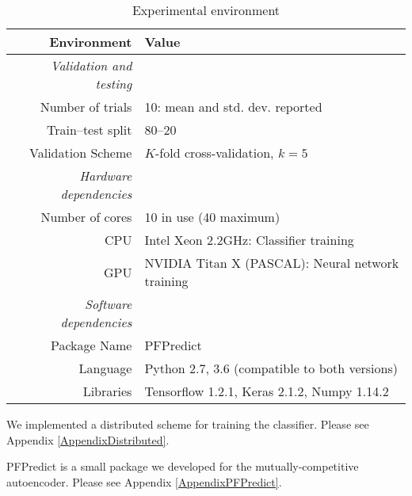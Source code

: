 \begin{table}[!h]
  \centering
  \caption{Experimental environment}
  \label{exp:implementation}
  \begin{threeparttable}
  \begin{tabular}{@{}rp{}@{}}
      \toprule
      Environment                    & Value                                             \\ \midrule
      \textit{Validation and testing}                                                    \\
      Number of trials               & 10: mean and std. dev. reported                   \\
      Train--test split              & 80--20                                            \\
      Validation Scheme              & $K$-fold cross-validation, $k=5$                  \\ \cmidrule{1-2}
      \textit{Hardware dependencies}                                                     \\
      Number of cores\tnote{1}       & 10 in use (40 maximum)                            \\
      CPU                            & Intel Xeon 2.2GHz: Classifier training            \\
      GPU                            & NVIDIA Titan X (PASCAL): Neural network training  \\ \cmidrule{1-2} 
      \textit{Software dependencies}                                                     \\
      Package Name                   & PFPredict\tnote{2}                                \\
      Language                & Python 2.7, 3.6 (compatible to both versions)            \\
      Libraries               & Tensorflow 1.2.1, Keras 2.1.2, Numpy 1.14.2              \\ \bottomrule
  \end{tabular}
  \begin{tablenotes}
    \footnotesize
    \item[1] We implemented a distributed scheme for training the classifier.
    Please see Appendix \ref{AppendixDistributed}.
    \item[2] PFPredict is a small package we developed for the mutually-competitive autoencoder.
    Please see Appendix \ref{AppendixPFPredict}.
  \end{tablenotes}
  \end{threeparttable}
\end{table}

